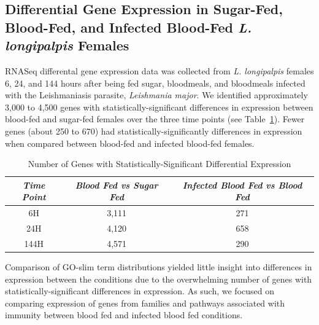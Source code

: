 \subsection{Differential Gene Expression in Sugar-Fed, Blood-Fed, and Infected Blood-Fed \emph{L. longipalpis} Females}
RNASeq differental gene expression data was collected from \emph{L. longipalpis} females 6, 24, and 144 hours after being fed sugar, bloodmeals, and bloodmeals infected with the Leishmaniasis parasite, \emph{Leishmania major}.  We identified approximately 3,000 to 4,500 genes with statistically-significant differences in expression between blood-fed and sugar-fed females over the three time points (see Table~\ref{tab:stat-sig-genes}).  Fewer genes (about 250 to 670) had statistically-significantly differences in expression when compared between blood-fed and infected blood-fed females.

\begin{table}[H]
  \centering
  \begin{tabular}{c c c} \hline
  \emph{Time Point} & \emph{Blood Fed vs Sugar Fed} & \emph{Infected Blood Fed vs Blood Fed} \\ \hline
  6H & 3,111 & 271 \\
  24H & 4,120 & 658 \\
  144H & 4,571 & 290 \\
  \end{tabular}
  \caption{Number of Genes with Statistically-Significant Differential Expression}
  \label{tab:stat-sig-genes}
\end{table}

Comparison of GO-slim term distributions yielded little insight into differences in expression between the conditions due to the overwhelming number of genes with statistically-significant differences in expression.  As such, we focused on comparing expression of genes from families and pathways associated with immunity between blood fed and infected blood fed conditions.


